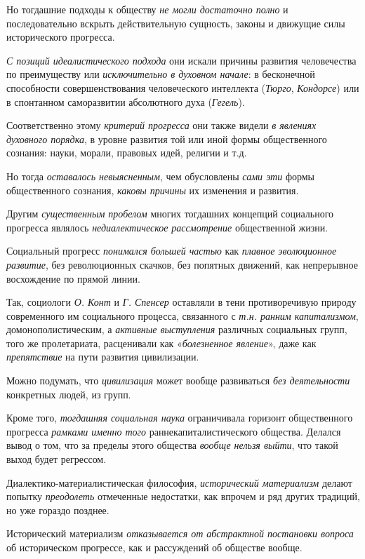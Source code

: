 \documentclass[a4paper,14pt,russian]{extreport}
\begin{document}
Но тогдашние подходы к обществу \emph{не могли достаточно полно} и последовательно вскрыть действительную сущность, законы и движущие силы исторического прогресса.

\emph{С позиций идеалистического подхода} они искали причины развития человечества по преимуществу или \emph{исключительно в духовном начале}: в бесконечной способности совершенствования человеческого интеллекта (\emph{Тюрго}, \emph{Кондорсе}) или в спонтанном саморазвитии абсолютного духа (\emph{Гегель}).

Соответственно этому \emph{критерий прогресса} они также видели \emph{в явлениях духовного порядка}, в уровне развития той или иной формы общественного сознания: науки, морали, правовых идей, религии и т.д.

Но тогда \emph{оставалось невыясненным}, чем обусловлены \emph{сами эти} формы общественного сознания, \emph{каковы причины} их изменения и развития.

Другим \emph{существенным пробелом} многих тогдашних концепций социального прогресса являлось \emph{недиалектическое рассмотрение} общественной жизни.

Социальный прогресс \emph{понимался большей частью} как \emph{плавное эволюционное развитие}, без революционных скачков, без попятных движений, как непрерывное восхождение по прямой линии.

Так, социологи \emph{О. Конт} и \emph{Г. Спенсер} оставляли в тени противоречивую природу современного им социального процесса, связанного с \emph{т.н. ранним капитализмом}, домонополистическим, а \emph{активные выступления} различных социальных групп, того же пролетариата, расценивали как «\emph{болезненное явление}», даже как \emph{препятствие} на пути развития цивилизации.

Можно подумать, что \emph{цивилизация} может вообще развиваться \emph{без деятельности} конкретных людей, из групп.

Кроме того, \emph{тогдашняя социальная наука} ограничивала горизонт общественного прогресса \emph{рамками именно того} раннекапиталистического общества. Делался вывод о том, что за пределы этого общества \emph{вообще нельзя выйти}, что такой выход будет регрессом.

Диалектико-материалистическая философия, \emph{исторический материализм} делают попытку \emph{преодолеть} отмеченные недостатки, как впрочем и ряд других традиций, но уже гораздо позднее.

Исторический материализм \emph{отказывается от абстрактной постановки вопроса} об историческом прогрессе, как и рассуждений об обществе вообще.
\end{document}
